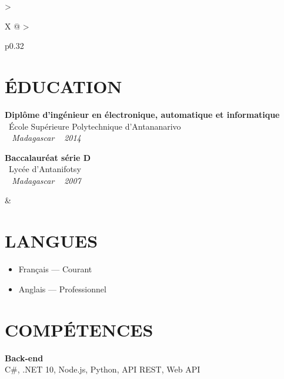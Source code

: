 \documentclass[10pt,a4paper]{article}
\begin{document}
\setlength{\tabcolsep}{0pt}
\begin{tabularx}{\textwidth}{
  >{\raggedright\arraybackslash}X
  @{\hspace{1cm}}
  >{\raggedright\arraybackslash}p{0.32\textwidth}
}
\begin{minipage}[t]{\linewidth}
\section*{ÉDUCATION}

\textbf{Diplôme d'ingénieur en électronique, automatique et informatique}\\
\textcolor{primary}{ \faGraduationCap\ École Supérieure Polytechnique d'Antananarivo}\\
\textit{ \small \textcolor{darkgray}{ \faMapMarker\ } Madagascar } \hfill  \textit{ \small \textcolor{darkgray}{ \faCalendar\ } 2014 }

\vspace{6pt}

\textbf{Baccalauréat série D}\\
\textcolor{primary}{ \faGraduationCap\ Lycée d'Antanifotsy}\\
\textit{ \small \textcolor{darkgray}{ \faMapMarker\ } Madagascar } \hfill  \textit{ \small \textcolor{darkgray}{ \faCalendar\ } 2007 }
\end{minipage}
&
\begin{minipage}[t]{\linewidth}

\section*{LANGUES}

\begin{itemize}
  \item Français --- Courant
  \item Anglais --- Professionnel
\end{itemize}

\section*{COMPÉTENCES}

\textbf{\color{primary} Back-end}\\
\color{darkgray} C\#, .NET 10, Node.js, Python, API REST, Web API

\vspace{4pt}


\end{minipage}
\end{tabularx}
\end{document}
